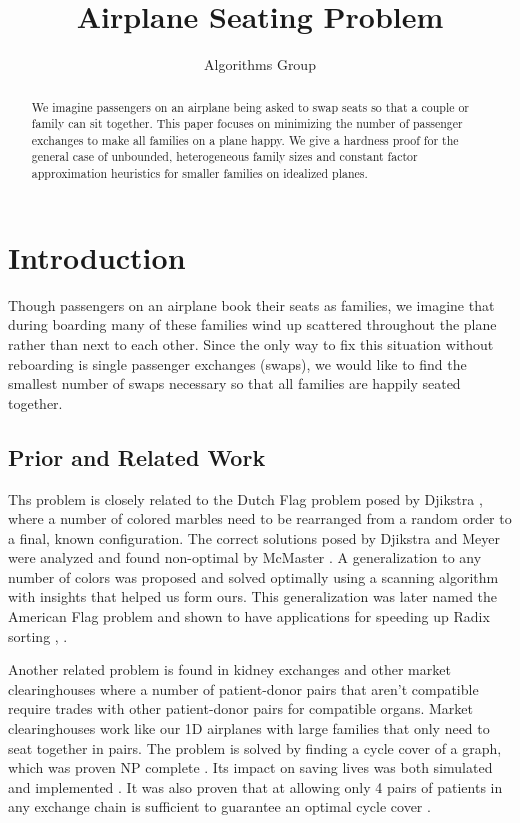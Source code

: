 \documentclass[a4paper]{article}
\title{Airplane Seating Problem}
\author{Algorithms Group}
\begin{document}

\maketitle

\begin{abstract}
We imagine passengers on an airplane being asked to swap seats so that a couple or family can sit together.  This paper focuses on minimizing the number of passenger exchanges to make all families on a plane happy.  We give a hardness proof for the general case of unbounded, heterogeneous family sizes and constant factor approximation heuristics for smaller families on idealized planes.
\end{abstract}

\section{Introduction}
Though passengers on an airplane book their seats as families, we imagine that during boarding many of these families wind up scattered throughout the plane rather than next to each other.  Since the only way to fix this situation without reboarding is single passenger exchanges (swaps), we would like to find the smallest number of swaps necessary so that all families are happily seated together.

\subsection{Prior and Related Work}

Ths problem is closely related to the Dutch Flag problem posed by Djikstra \cite{dijkstra1976discipline}, where a number of colored marbles need to be rearranged from a random order to a final, known configuration.  The correct solutions posed by Djikstra and Meyer were analyzed and found non-optimal by McMaster \cite{mcMaster1978analysis}.  A generalization to any number of colors was proposed and solved optimally \cite{bitner1982asymptotically} using a scanning algorithm with insights that helped us form ours.  This generalization was later named the American Flag problem and shown to have applications for speeding up Radix sorting \cite{mcllroy1993engineering}, \cite{al2005formulation}.

Another related problem is found in kidney exchanges and other market clearinghouses where a number of patient-donor pairs that aren't compatible require trades with other patient-donor pairs for compatible organs.  Market clearinghouses work like our 1D airplanes with large families that only need to seat together in pairs.  The problem is solved by finding a cycle cover of a graph, which was proven NP complete \cite{abraham2007clearing}.  Its impact on saving lives was both simulated \cite{roth2004kidney} and implemented \cite{abraham2007clearing}.  It was also proven that at allowing only 4 pairs of patients in any exchange chain is sufficient to guarantee an optimal cycle cover \cite{roth2007efficient}.
\end{document}
